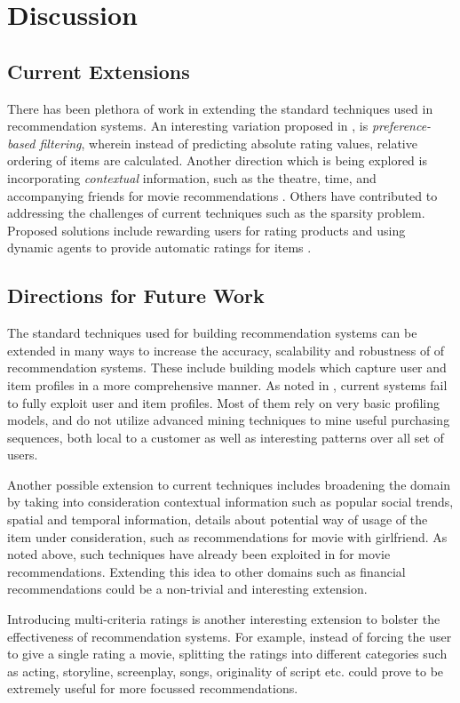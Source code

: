 \section{Discussion}
\subsection{Current Extensions}
There has been plethora of work in extending the standard techniques used in recommendation systems. An interesting variation proposed in \cite{jin:preference}, \cite{jin:collaborative} is \textit{preference-based filtering}, wherein instead of predicting absolute rating values, relative ordering of items are calculated. Another direction which is being explored is incorporating \textit{contextual} information, such as the theatre, time, and accompanying friends for movie recommendations \cite{adomavicius:contextual}. Others have contributed to addressing the challenges of current techniques such as the sparsity problem. Proposed solutions include rewarding users for rating products and using dynamic agents to provide automatic ratings for items \cite{sarwar:agents}.
\subsection{Directions for Future Work}
The standard techniques used for building recommendation systems can be extended in many ways to increase the accuracy, scalability and robustness of of recommendation systems. These include building models which capture user and item profiles in a more comprehensive manner. As noted in \cite{balabanovic:fab}, current systems fail to fully exploit user and item profiles. Most of them rely on very basic profiling models, and do not utilize advanced mining techniques to mine useful purchasing sequences, both local to a customer as well as interesting patterns over all set of users.

Another possible extension to current techniques includes broadening the domain by taking into consideration contextual information such as popular social trends, spatial and temporal information, details about potential way of usage of the item under consideration, such as recommendations for movie with girlfriend. As noted above, such techniques have already been exploited in \cite{adomavicius:contextual} for movie recommendations. Extending this idea to other domains such as financial recommendations could be a non-trivial and interesting extension.

Introducing multi-criteria ratings is another interesting extension to bolster the effectiveness of recommendation systems. For example, instead of forcing the user to give a single rating a movie, splitting the ratings into different categories such as acting, storyline, screenplay, songs, originality of script etc. could prove to be extremely useful for more focussed recommendations.

